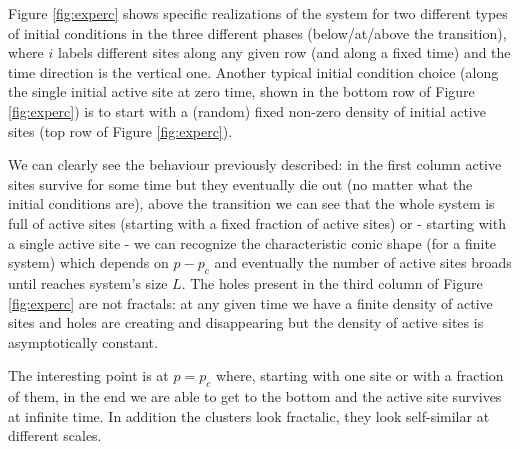 \documentclass[\main/main.tex]{subfiles}
\begin{document}
Figure \ref{fig:experc} shows specific realizations of the system for two different types of initial conditions in the three different phases (below/at/above the transition), where $i$ labels different sites along any given row (and along a fixed time) and the time direction is the vertical one. Another typical initial condition choice (along the single initial active site at zero time, shown in the bottom row of Figure \ref{fig:experc}) is to start with a (random) fixed non-zero density of initial active sites (top row of Figure \ref{fig:experc}).

We can clearly see the behaviour previously described: in the first column active sites survive for some time but they eventually die out (no matter what the initial conditions are), above the transition we can see that the whole system is full of active sites (starting with a fixed fraction of active sites) or - starting with a single active site - we can recognize the characteristic conic shape (for a finite system) which depends on $p-p_c$ and eventually the number of active sites broads until reaches system's size $L$. The holes present in the third column of Figure \ref{fig:experc} are not fractals: at any given time we have a finite density of active sites and holes are creating and disappearing but the density of active sites is asymptotically constant.

The interesting point is at $p=p_c$ where, starting with one site or with a fraction of them, in the end we are able to get to the bottom and the active site survives at infinite time. In addition the clusters look fractalic, they look self-similar at different scales.
\end{document}
